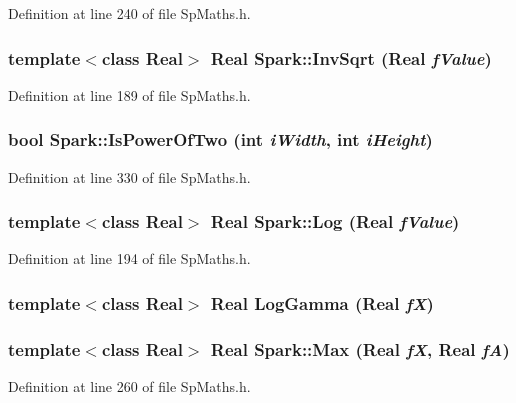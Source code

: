 Definition at line 240 of file Sp\-Maths.h.
\subsubsection{\setlength{\rightskip}{0pt plus 5cm}template$<$class Real$>$ Real Spark::Inv\-Sqrt (Real {\em f\-Value})}\label{namespaceSpark_a45}


Definition at line 189 of file Sp\-Maths.h.
\subsubsection{\setlength{\rightskip}{0pt plus 5cm}bool Spark::Is\-Power\-Of\-Two (int {\em i\-Width}, int {\em i\-Height})\hspace{0.3cm}{\tt  [inline]}}\label{namespaceSpark_a68}


Definition at line 330 of file Sp\-Maths.h.
\subsubsection{\setlength{\rightskip}{0pt plus 5cm}template$<$class Real$>$ Real Spark::Log (Real {\em f\-Value})}\label{namespaceSpark_a46}


Definition at line 194 of file Sp\-Maths.h.
\subsubsection{\setlength{\rightskip}{0pt plus 5cm}template$<$class Real$>$ Real Log\-Gamma (Real {\em f\-X})}\label{namespaceSpark_a37}


\subsubsection{\setlength{\rightskip}{0pt plus 5cm}template$<$class Real$>$ Real Spark::Max (Real {\em f\-X}, Real {\em f\-A})}\label{namespaceSpark_a56}


Definition at line 260 of file Sp\-Maths.h.
